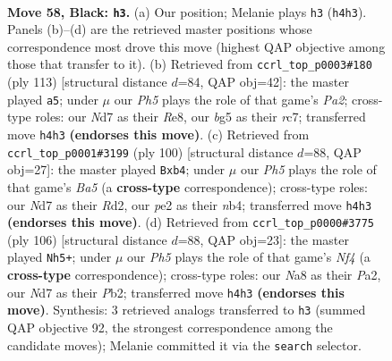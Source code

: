 \documentclass[11pt]{article}
\begin{document}
\clearpage

\begin{figure}[p]\centering
\begin{subfigure}{0.46\textwidth}\centering
\resizebox{\linewidth}{!}{%
\newchessgame
\chessboard[
  setfen={n4k2/1p1n4/1b1N4/p2p2Bb/7p/PP2P3/4P3/3B2K1 b - - 13 58},
  showmover=false,
  pgfstyle=straightmove, color=movearrow, markmove={h4-h3}
]}
\caption{}
\end{subfigure}\hfill
\begin{subfigure}{0.46\textwidth}\centering
\resizebox{\linewidth}{!}{%
\newchessgame
\chessboard[
  setfen={4r1bk/p1R3p1/7p/8/2P4P/nB5P/P3p2K/4B3 b - - 2 57},
  showmover=false,
  pgfstyle=straightmove, color=movearrow, markmove={a7-a5}
]}
\caption{}
\end{subfigure}
\\[4pt]
\begin{subfigure}{0.46\textwidth}\centering
\resizebox{\linewidth}{!}{%
\newchessgame
\chessboard[
  setfen={r5k1/4bp1p/2p4P/Bp3pP1/1n3P2/7K/3R2B1/8 w - - 2 51},
  showmover=false,
  pgfstyle=straightmove, color=movearrow, markmove={a5-b4}
]}
\caption{}
\end{subfigure}\hfill
\begin{subfigure}{0.46\textwidth}\centering
\resizebox{\linewidth}{!}{%
\newchessgame
\chessboard[
  setfen={8/1b6/p4k2/3P1p2/5Nr1/4R1p1/PP4Bp/7K w - - 8 54},
  showmover=false,
  pgfstyle=straightmove, color=movearrow, markmove={f4-h5}
]}
\caption{}
\end{subfigure}
\caption{\textbf{Move 58, Black: \texttt{h3}.} (a) Our position; Melanie plays \texttt{h3} (\texttt{h4h3}). Panels (b)--(d) are the retrieved master positions whose correspondence most drove this move (highest QAP objective among those that transfer to it). (b) Retrieved from \texttt{ccrl\_top\_p0003\#180} (ply 113) [structural distance $d$=84, QAP obj=42]: the master played \texttt{a5}; under $\mu$ our \emph{Ph5} plays the role of that game's \emph{Pa2}; cross-type roles: our \emph{N}d7 as their \emph{R}e8, our \emph{b}g5 as their \emph{r}c7; transferred move \texttt{h4h3} \textbf{(endorses this move)}. (c) Retrieved from \texttt{ccrl\_top\_p0001\#3199} (ply 100) [structural distance $d$=88, QAP obj=27]: the master played \texttt{Bxb4}; under $\mu$ our \emph{Ph5} plays the role of that game's \emph{Ba5} (a \textbf{cross-type} correspondence); cross-type roles: our \emph{N}d7 as their \emph{R}d2, our \emph{p}e2 as their \emph{n}b4; transferred move \texttt{h4h3} \textbf{(endorses this move)}. (d) Retrieved from \texttt{ccrl\_top\_p0000\#3775} (ply 106) [structural distance $d$=88, QAP obj=23]: the master played \texttt{Nh5+}; under $\mu$ our \emph{Ph5} plays the role of that game's \emph{Nf4} (a \textbf{cross-type} correspondence); cross-type roles: our \emph{N}a8 as their \emph{P}a2, our \emph{N}d7 as their \emph{P}b2; transferred move \texttt{h4h3} \textbf{(endorses this move)}. Synthesis: 3 retrieved analogs transferred to \texttt{h3} (summed QAP objective 92, the strongest correspondence among the candidate moves); Melanie committed it via the \texttt{search} selector.}
\label{fig:thought-m115}
\end{figure}
\end{document}
